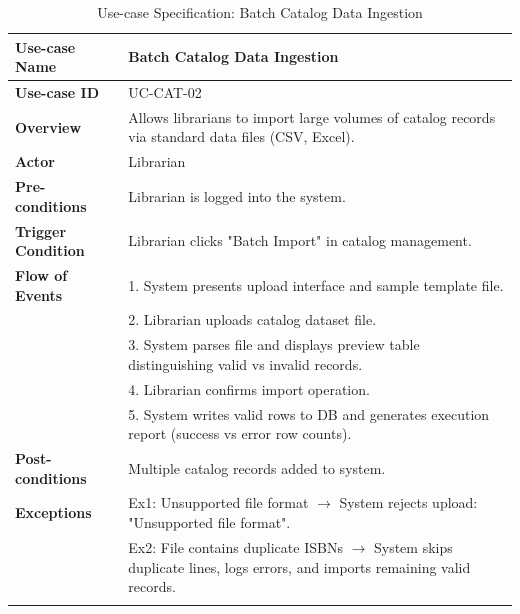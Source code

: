 \newpage
\begin{longtable}{|p{3.5cm}|p{11.5cm}|}
    \hline
    \textbf{Use-case Name} & \textbf{Batch Catalog Data Ingestion} \\
    \hline
    \textbf{Use-case ID} & UC-CAT-02 \\
    \hline
    \textbf{Overview} & Allows librarians to import large volumes of catalog records via standard data files (CSV, Excel). \\
    \hline
    \textbf{Actor} & Librarian \\
    \hline
    \textbf{Pre-conditions} & Librarian is logged into the system. \\
    \hline
    \textbf{Trigger Condition} & Librarian clicks "Batch Import" in catalog management. \\
    \hline
    \textbf{Flow of Events} & 
    1. System presents upload interface and sample template file.\\ 
 & 
    2. Librarian uploads catalog dataset file.\\ 
 & 
    3. System parses file and displays preview table distinguishing valid vs invalid records.\\ 
 & 
    4. Librarian confirms import operation.\\ 
 & 
    5. System writes valid rows to DB and generates execution report (success vs error row counts). \\
    \hline
    \textbf{Post-conditions} & Multiple catalog records added to system. \\
    \hline
    \textbf{Exceptions} & 
    Ex1: Unsupported file format $\rightarrow$ System rejects upload: "Unsupported file format".\\ 
 & 
    Ex2: File contains duplicate ISBNs $\rightarrow$ System skips duplicate lines, logs errors, and imports remaining valid records. \\
    \hline
    \caption{Use-case Specification: Batch Catalog Data Ingestion} \\
\end{longtable}

